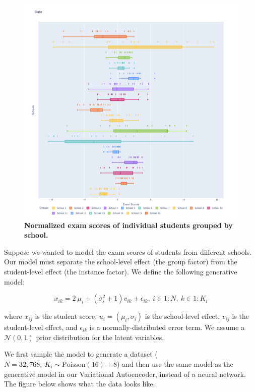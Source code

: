 \documentclass[nohyperref]{article}
\theoremstyle{plain}
\theoremstyle{definition}
\theoremstyle{remark}
\begin{document}
\begin{figure}[ht]
    \vskip 0.2in
    \begin{center}
    \centerline{\includegraphics[width=\columnwidth]{files/data.pdf}}
    \caption{\textbf{Normalized exam scores of individual students grouped by school.}}
    \label{exam-score}
    \end{center}
    \vskip -0.2in
\end{figure}

Suppose we wanted to model the exam scores of students from different schools. Our model must separate the school-level effect (the group factor) from the student-level effect (the instance factor). We define the following generative model:

$$x_{ik} = 2 ~ \mu_i +  (\sigma^2_i + 1) v_{ik} + \epsilon_{ik}, ~ i \in 1:N, ~ k \in 1:K_i$$

where $x_{ij}$ is the student score, $u_i = (\mu_i, \sigma_i)$ is the school-level effect, $v_{ij}$ is the student-level effect, and $\epsilon_{ik}$ is a normally-distributed error term. We assume a $\mathcal{N} (0, 1)$ prior distribution for the latent variables.

We first sample the model to generate a dataset ($N = 32,768, ~ K_i \sim \mathrm{Poisson} (16) + 8$) and then use the same model as the generative model in our Variational Autoencoder, instead of a neural network. The figure below shows what the data looks like.
\end{document}
